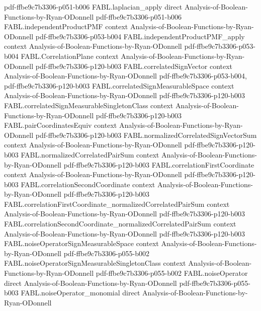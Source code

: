 \begin{theorem}
  {pdf-ffbe9c7b3306-p051-b006}
\proofstep
  {FABL.laplacian_apply}
  {direct}
  {Analysis-of-Boolean-Functions-by-Ryan-ODonnell}
  {pdf-ffbe9c7b3306-p051-b006}
\proofstep
  {FABL.independentProductPMF}
  {context}
  {Analysis-of-Boolean-Functions-by-Ryan-ODonnell}
  {pdf-ffbe9c7b3306-p053-b004}
\proofstep
  {FABL.independentProductPMF_apply}
  {context}
  {Analysis-of-Boolean-Functions-by-Ryan-ODonnell}
  {pdf-ffbe9c7b3306-p053-b004}
\proofstep
  {FABL.CorrelationPlane}
  {context}
  {Analysis-of-Boolean-Functions-by-Ryan-ODonnell}
  {pdf-ffbe9c7b3306-p120-b003}
\proofstep
  {FABL.correlatedSignVector}
  {context}
  {Analysis-of-Boolean-Functions-by-Ryan-ODonnell}
  {pdf-ffbe9c7b3306-p053-b004,
    pdf-ffbe9c7b3306-p120-b003}
\proofstep
  {FABL.correlatedSignMeasurableSpace}
  {context}
  {Analysis-of-Boolean-Functions-by-Ryan-ODonnell}
  {pdf-ffbe9c7b3306-p120-b003}
\proofstep
  {FABL.correlatedSignMeasurableSingletonClass}
  {context}
  {Analysis-of-Boolean-Functions-by-Ryan-ODonnell}
  {pdf-ffbe9c7b3306-p120-b003}
\proofstep
  {FABL.pairCoordinatesEquiv}
  {context}
  {Analysis-of-Boolean-Functions-by-Ryan-ODonnell}
  {pdf-ffbe9c7b3306-p120-b003}
\proofstep
  {FABL.normalizedCorrelatedSignVectorSum}
  {context}
  {Analysis-of-Boolean-Functions-by-Ryan-ODonnell}
  {pdf-ffbe9c7b3306-p120-b003}
\proofstep
  {FABL.normalizedCorrelatedPairSum}
  {context}
  {Analysis-of-Boolean-Functions-by-Ryan-ODonnell}
  {pdf-ffbe9c7b3306-p120-b003}
\proofstep
  {FABL.correlationFirstCoordinate}
  {context}
  {Analysis-of-Boolean-Functions-by-Ryan-ODonnell}
  {pdf-ffbe9c7b3306-p120-b003}
\proofstep
  {FABL.correlationSecondCoordinate}
  {context}
  {Analysis-of-Boolean-Functions-by-Ryan-ODonnell}
  {pdf-ffbe9c7b3306-p120-b003}
\proofstep
  {FABL.correlationFirstCoordinate_normalizedCorrelatedPairSum}
  {context}
  {Analysis-of-Boolean-Functions-by-Ryan-ODonnell}
  {pdf-ffbe9c7b3306-p120-b003}
\proofstep
  {FABL.correlationSecondCoordinate_normalizedCorrelatedPairSum}
  {context}
  {Analysis-of-Boolean-Functions-by-Ryan-ODonnell}
  {pdf-ffbe9c7b3306-p120-b003}
\proofstep
  {FABL.noiseOperatorSignMeasurableSpace}
  {context}
  {Analysis-of-Boolean-Functions-by-Ryan-ODonnell}
  {pdf-ffbe9c7b3306-p055-b002}
\proofstep
  {FABL.noiseOperatorSignMeasurableSingletonClass}
  {context}
  {Analysis-of-Boolean-Functions-by-Ryan-ODonnell}
  {pdf-ffbe9c7b3306-p055-b002}
\proofstep
  {FABL.noiseOperator}
  {direct}
  {Analysis-of-Boolean-Functions-by-Ryan-ODonnell}
  {pdf-ffbe9c7b3306-p055-b003}
\proofstep
  {FABL.noiseOperator_monomial}
  {direct}
  {Analysis-of-Boolean-Functions-by-Ryan-ODonnell}

\end{theorem}
